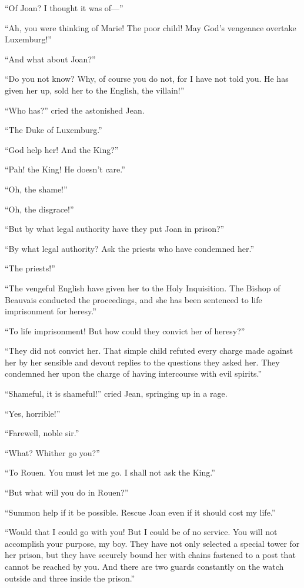 ``Of Joan? I thought it was of---''

``Ah, you were thinking of Marie! The poor child! May God's vengeance
overtake Luxemburg!''

``And what about Joan?''

``Do you not know? Why, of course you do not, for I have not told you.
He has given her up, sold her to the English, the villain!''

``Who has?'' cried the astonished Jean.

``The Duke of Luxemburg.''

``God help her! And the King?''

``Pah! the King! He doesn't care.''

``Oh, the shame!''

``Oh, the disgrace!''

``But by what legal authority have they put Joan in prison?''

``By what legal authority? Ask the priests who have condemned her.''

``The priests!''

``The vengeful English have given her to the Holy Inquisition. The
Bishop of Beauvais conducted the proceedings, and she has been sentenced
to life imprisonment for heresy.''

``To life imprisonment! But how could they convict her of heresy?''

``They did not convict her. That simple child refuted every charge made
against her by her sensible and devout replies to the questions they
asked her. They condemned her upon the charge of having intercourse with
evil spirits.''

``Shameful, it is shameful!'' cried Jean, springing up in a rage.

``Yes, horrible!''

``Farewell, noble sir.''

``What? Whither go you?''

``To Rouen. You must let me go. I shall not ask the King.''

``But what will you do in Rouen?''

``Summon help if it be possible. Rescue Joan even if it should cost my
life.''

``Would that I could go with you! But I could be of no service. You will
not accomplish your purpose, my boy. They have not only selected a
special tower for her prison, but they have securely bound her with
chains fastened to a post that cannot be reached by you. And there are
two guards constantly on the watch outside and three inside the
prison.''

